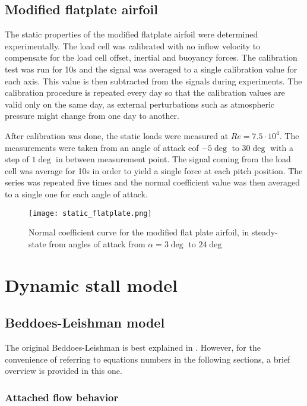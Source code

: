 \subsection{Modified flatplate airfoil}

The static properties of the modified flatplate airfoil were determined experimentally. The load cell was calibrated with no inflow velocity to compensate for the load cell offset, inertial and  buoyancy forces. The calibration test was run for 10s and the signal was averaged to a single calibration value for each axis. This value is then subtracted from the signals during experiments. The calibration procedure is repeated every day so that the calibration values are valid only on the same day, as external perturbations such as atmospheric pressure might change from one day to another. 

After calibration was done, the static loads were measured at $Re=7.5\cdot10^4$. The measurements were taken from an angle of attack eof $-5 \deg$ to $30 \deg$ with a step of $1 \deg$ in between measurement point. The signal coming from the load cell was average for 10s in order to yield a single force at each pitch position. The series was repeated five times and the normal coefficient value was then averaged to a single one for each angle of attack. 

\begin{figure}[h]
\centering
\texttt{[image: static\_flatplate.png]}
\caption{Normal coefficient curve for the modified flat plate airfoil, in steady-state from angles of attack from $\alpha=3 \deg$ to $24 \deg$}
\label{fig:static_flatplate}
\end{figure}

\section{Dynamic stall model}

\subsection{Beddoes-Leishman model}

The original Beddoes-Leishman is best explained in \autocite{tank_possibility_2017}. However, for the convenience of referring to equations numbers in the following sections, a brief overview is provided in this one. 

\subsubsection{Attached flow behavior}


